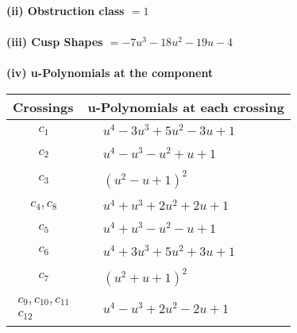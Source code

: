 \documentclass[1p]{elsarticle_modified}
\theoremstyle{definition}
\begin{document}
\flushleft \textbf{(ii) Obstruction class $= 1$}\\~\\
\flushleft \textbf{(iii) Cusp Shapes $= -7 u^3-18 u^2-19 u-4$}\\~\\
\newpage\renewcommand{\arraystretch}{1}
\flushleft \textbf{(iv) u-Polynomials at the component}\newline \\
\begin{tabular}{m{50pt}|m{274pt}}
Crossings & \hspace{64pt}u-Polynomials at each crossing \\
\hline $$\begin{aligned}c_{1}\end{aligned}$$&$\begin{aligned}
&u^4-3 u^3+5 u^2-3 u+1
\end{aligned}$\\
\hline $$\begin{aligned}c_{2}\end{aligned}$$&$\begin{aligned}
&u^4- u^3- u^2+u+1
\end{aligned}$\\
\hline $$\begin{aligned}c_{3}\end{aligned}$$&$\begin{aligned}
&(u^2- u+1)^2
\end{aligned}$\\
\hline $$\begin{aligned}c_{4},c_{8}\end{aligned}$$&$\begin{aligned}
&u^4+u^3+2 u^2+2 u+1
\end{aligned}$\\
\hline $$\begin{aligned}c_{5}\end{aligned}$$&$\begin{aligned}
&u^4+u^3- u^2- u+1
\end{aligned}$\\
\hline $$\begin{aligned}c_{6}\end{aligned}$$&$\begin{aligned}
&u^4+3 u^3+5 u^2+3 u+1
\end{aligned}$\\
\hline $$\begin{aligned}c_{7}\end{aligned}$$&$\begin{aligned}
&(u^2+u+1)^2
\end{aligned}$\\
\hline $$\begin{aligned}c_{9},c_{10},c_{11}\\c_{12}\end{aligned}$$&$\begin{aligned}
&u^4- u^3+2 u^2-2 u+1
\end{aligned}$\\
\hline
\end{tabular}\\~\\
\end{document}
